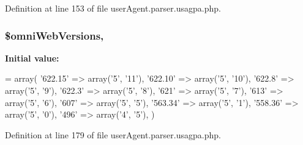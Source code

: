 Definition at line 153 of file user\-Agent.\-parser.\-usagpa.\-php.

\hypertarget{class_user_agent_parser_a0f50a04746313e5adeaaa8fe0edcb115}{
\subsubsection[{\$omni\-Web\-Versions}]{\setlength{\rightskip}{0pt plus 5cm}\$omni\-Web\-Versions\hspace{0.3cm}{\ttfamily [static]}, {\ttfamily [protected]}}}\label{class_user_agent_parser_a0f50a04746313e5adeaaa8fe0edcb115}
{\bfseries Initial value\-:}
\begin{DoxyCode}
= array(
        \textcolor{stringliteral}{'622.15'}    => array(\textcolor{charliteral}{'5'}, \textcolor{stringliteral}{'11'}),
        \textcolor{stringliteral}{'622.10'}    => array(\textcolor{charliteral}{'5'}, \textcolor{stringliteral}{'10'}),
        \textcolor{stringliteral}{'622.8'}     => array(\textcolor{charliteral}{'5'}, \textcolor{charliteral}{'9'}),
        \textcolor{stringliteral}{'622.3'}     => array(\textcolor{charliteral}{'5'}, \textcolor{charliteral}{'8'}),
        \textcolor{stringliteral}{'621'}       => array(\textcolor{charliteral}{'5'}, \textcolor{charliteral}{'7'}),
        \textcolor{stringliteral}{'613'}       => array(\textcolor{charliteral}{'5'}, \textcolor{charliteral}{'6'}),
        \textcolor{stringliteral}{'607'}       => array(\textcolor{charliteral}{'5'}, \textcolor{charliteral}{'5'}),
        \textcolor{stringliteral}{'563.34'}    => array(\textcolor{charliteral}{'5'}, \textcolor{charliteral}{'1'}),
        \textcolor{stringliteral}{'558.36'}    => array(\textcolor{charliteral}{'5'}, \textcolor{charliteral}{'0'}),
        \textcolor{stringliteral}{'496'}       => array(\textcolor{charliteral}{'4'}, \textcolor{charliteral}{'5'}),
    )
\end{DoxyCode}


Definition at line 179 of file user\-Agent.\-parser.\-usagpa.\-php.

